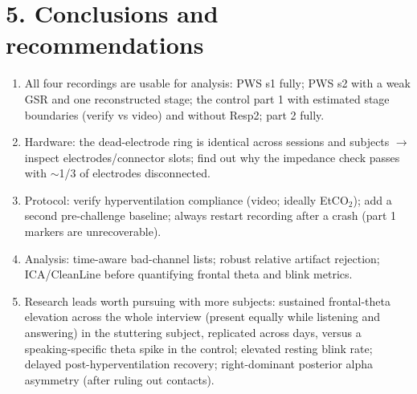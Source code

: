 \documentclass[11pt,a4paper]{article}
\begin{document}
\section*{5. Conclusions and recommendations}
\begin{enumerate}\setlength\itemsep{1pt}
\item All four recordings are usable for analysis: PWS s1 fully; PWS s2 with a weak GSR and one
reconstructed stage; the control part 1 with estimated stage boundaries (verify vs video) and without
Resp2; part 2 fully.
\item Hardware: the dead-electrode ring is identical across sessions and subjects $\rightarrow$
inspect electrodes/connector slots; find out why the impedance check passes with $\sim$1/3 of
electrodes disconnected.
\item Protocol: verify hyperventilation compliance (video; ideally EtCO$_2$); add a second
pre-challenge baseline; always restart recording after a crash (part 1 markers are unrecoverable).
\item Analysis: time-aware bad-channel lists; robust relative artifact rejection; ICA/CleanLine
before quantifying frontal theta and blink metrics.
\item Research leads worth pursuing with more subjects: sustained frontal-theta elevation across the
whole interview (present equally while listening and answering) in the stuttering subject,
replicated across days, versus a speaking-specific theta spike in the control; elevated resting
blink rate; delayed
post-hyperventilation recovery; right-dominant posterior alpha asymmetry (after ruling out contacts).
\end{enumerate}
\end{document}
